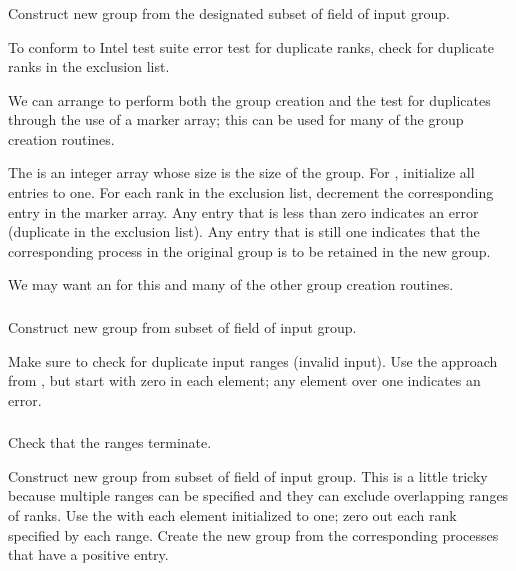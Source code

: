 \documentclass{article}
\begin{document}
\subsubsection{}
\begin{adi3}
  Construct new group from the designated subset of
   field of input group.

  To conform to Intel test suite error test for duplicate ranks, check for 
  duplicate ranks in the exclusion list.

  We can arrange to perform both the group creation and the test for
  duplicates through the use of a marker array; this can be used for many of
  the group creation routines.

  The  is an integer array whose size is the size of
  the group.  For , initialize all entries to one.
  For each rank in the exclusion list, decrement the corresponding entry in
  the marker array.  Any entry that is less than zero indicates an error
  (duplicate in the exclusion list).  Any entry that is still one indicates
  that the corresponding process in the original group is to be retained in
  the new group.

  We may want an  for this and many of
  the other group creation routines.
\end{adi3}

\subsubsection{}
\begin{adi3}
  Construct new group from subset of  field of
  input group.

  Make sure to check for duplicate input ranges (invalid input).  Use the
   approach from , but start
  with zero in each element; any element over one indicates an error.
\end{adi3}

\subsubsection{}
  Check that the ranges terminate.  
\begin{adi3}
  Construct new group from subset of  field of
  input group.  This is a little tricky because multiple ranges can be
  specified and they can exclude overlapping ranges of ranks.  
  Use the  with each element initialized to one; zero
  out each rank specified by each range.  Create the new group from the
  corresponding processes that have a positive entry.
\end{adi3}
\end{document}
